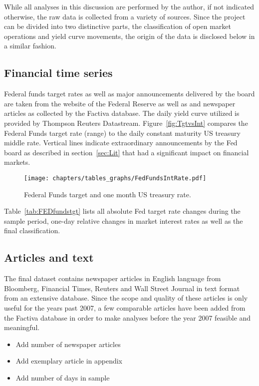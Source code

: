 
While all analyses in this discussion are performed by the author, if not indicated otherwise, the raw data is collected from a variety of sources. Since the project can be divided into two distinctive parts, the classification of open market operations and yield curve movements, the origin of the data is disclosed below in a similar fashion.

\subsection{Financial time series}
Federal funds target rates as well as major announcements delivered by the board are taken from the website of the Federal Reserve \cite{Fed.OMOs} as well as \textcite{Fawley.2013} and newspaper articles as collected by the Factiva database. The daily yield curve utilized is provided by Thompson Reuters Datastream. Figure~\vref{fig:TgtvsInt} compares the Federal Funds target rate (range) to the daily constant maturity US treasury middle rate. Vertical lines indicate extraordinary announcements by the Fed board as described in section~\ref{sec:Lit} that had a significant impact on financial markets.
\begin{figure}[htbp]
	\centering
		\texttt{[image: chapters/tables\_graphs/FedFundsIntRate.pdf]} 
	\caption{Federal Funds target and one month US treasury rate.}
\label{fig:TgtvsInt}
\end{figure}
%

Table~\vref{tab:FEDfundstgt} lists all absolute Fed target rate changes during the sample period, one-day relative changes in market interest rates as well as the final classification.
%

%

\subsection{Articles and text}
The final dataset contains newspaper articles in English language from Bloomberg, Financial Times, Reuters and Wall Street Journal in text format from an extensive database. Since the scope and quality of these articles is only useful for the years past 2007, a few comparable articles have been added from the Factiva database in order to make analyses before the year 2007 feasible and meaningful. 
%
\begin{itemize}
	\item Add number of newspaper articles
	\item Add exemplary article in appendix
	\item Add number of days in sample
\end{itemize}